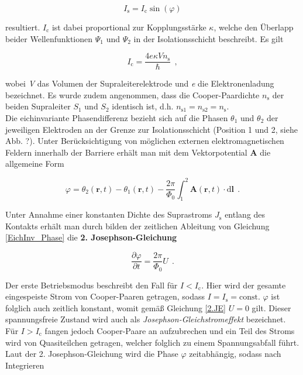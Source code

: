  

\begin{equation}
\label{1.JE}
I_\mathrm{s} = I_\mathrm{c}\sin(\varphi)
\end{equation}

resultiert. $I_\mathrm{c}$ ist dabei proportional zur Kopplungsstärke $\kappa$, welche den Überlapp beider Wellenfunktionen $\Psi_1$ und $\Psi_2$ in der Isolationsschicht beschreibt. Es gilt

\begin{equation}
I_\mathrm{c} = \frac{4e\kappa V n_\mathrm{s}}{\hbar} \ \ ,
\end{equation}

wobei \textit{V} das Volumen der Supraleiterelektrode und \textit{e} die Elektronenladung bezeichnet. Es wurde zudem angenommen, dass die Cooper-Paardichte $n_\mathrm{s}$ der beiden Supraleiter $S_1$ und $S_2$ identisch ist, d.h. $n_{\mathrm{s}1} = n_{\mathrm{s}2} = n_\mathrm{s}$. \\
Die eichinvariante Phasendifferenz bezieht sich auf die Phasen $\theta_1$ und $\theta_2$ der jeweiligen Elektroden an der Grenze zur Isolationsschicht (Position 1 und 2, siehe Abb. ?). Unter Berücksichtigung von möglichen externen elektromagnetischen Feldern innerhalb der Barriere erhält man mit dem Vektorpotential \textbf{A} die allgemeine Form

\begin{equation}
\label{EichInv_Phase}
\varphi = \theta_2(\textbf{r},t) - \theta_1(\textbf{r},t) - \frac{2\pi}{\Phi_0}\int_{1}^{2}\textbf{A}(\textbf{r},t)\cdot \mathrm{d}\textbf{l} \ \ .
\end{equation}

Unter Annahme einer konstanten Dichte des Suprastroms $J_\mathrm{s}$ entlang des Kontakts erhält man durch bilden der zeitlichen Ableitung von Gleichung \eqref{EichInv_Phase} die \textbf{2. Josephson-Gleichung}

\begin{equation}
\label{2.JE}
\frac{\partial\varphi}{\partial t} = \frac{2\pi}{\Phi_0}U \ \ .
\end{equation}

Der erste Betriebsmodus beschreibt den Fall für $I<I_\mathrm{c}$. Hier wird der gesamte eingespeiste Strom von Cooper-Paaren getragen, sodass $I=I_\mathrm{s}=\mathrm{const}$. $\varphi$ ist folglich auch zeitlich konstant, womit gemäß Gleichung \eqref{2.JE} $U=0$ gilt. Dieser spannungsfreie Zustand wird auch als \textit{Josephson-Gleichstromeffekt} bezeichnet. \\
Für $I>I_\mathrm{c}$ fangen jedoch Cooper-Paare an aufzubrechen und ein Teil des Stroms wird von Quasiteilchen getragen, welcher folglich zu einem Spannungsabfall führt. Laut der 2. Josephson-Gleichung wird die Phase $\varphi$ zeitabhängig, sodass nach Integrieren 


